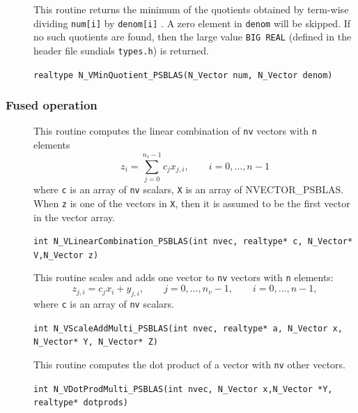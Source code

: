 \documentclass[twoside,a4paper]{refart}
\theoremstyle{definition}
\begin{document}
\begin{description}
 	\item[] This routine returns the minimum of the quotients obtained by term-wise
 	dividing \lstinline[style=CStyle]|num[i]| by \lstinline[style=CStyle]|denom[i]| . A zero element in \lstinline[style=CStyle]|denom| will be skipped. If no
 	such quotients are found, then the large value \lstinline[style=CStyle]|BIG REAL| (defined in the
 	header file sundials \texttt{types.h}) is returned.
 	
 	 \lstinline[style=CStyle]|realtype N_VMinQuotient_PSBLAS(N_Vector num, N_Vector denom)|
 	
\end{description}

\subsubsection{Fused operation}
\begin{description}
 	\item[] This routine computes the linear combination of \lstinline[style=CStyle]|nv| vectors with \lstinline[style=CStyle]|n| elements
 	\begin{equation*}
 		z_i = \sum_{j=0}^{n_v - 1} c_j x_{j,i}, \qquad i=0,\ldots,n-1
 	\end{equation*}
 	where \lstinline[style=CStyle]|c| is an array of \lstinline[style=CStyle]|nv| scalars, \lstinline[style=CStyle]|X| is an array of NVECTOR\_PSBLAS. When \lstinline[style=CStyle]|z| is one of the vectors in \lstinline[style=CStyle]|X|, then it is assumed to be the first vector in the vector array.
 	
 	 \lstinline[style=CStyle]|int N_VLinearCombination_PSBLAS(int nvec, realtype* c, N_Vector* V,N_Vector z)|
 	
 	\item[] This routine scales and adds one vector to \lstinline[style=CStyle]|nv| vectors with \lstinline[style=CStyle]|n| elements:
 	\begin{equation*}
 		z_{j,i} = c_j x_i + y_{j,i}, \qquad j=0,\ldots,n_v-1, \qquad i=0,\ldots,n-1,
 	\end{equation*}
 	where \lstinline[style=CStyle]|c| is an array of \lstinline[style=CStyle]|nv| scalars.
 	
 	 \lstinline[style=CStyle]|int N_VScaleAddMulti_PSBLAS(int nvec, realtype* a, N_Vector x, N_Vector* Y, N_Vector* Z)|
 	
 	\item[] This routine computes the dot product of a vector with \lstinline[style=CStyle]|nv| other vectors.
 	
 	 \lstinline[style=CStyle]|int N_VDotProdMulti_PSBLAS(int nvec, N_Vector x,N_Vector *Y, realtype* dotprods)|
 \end{description}
\end{document}
